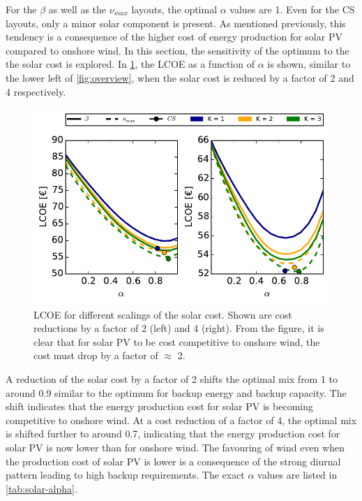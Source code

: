 \documentclass[a4paper, 12pt, sort&compress]{elsarticle}%
\begin{document}
For the $\beta$ as well as the $\nu_{max}$ layouts, the optimal
$\alpha$ values are 1. Even for the CS layouts, only a minor solar
component is present. As mentioned previously, this tendency is a
consequence of the higher cost of energy production for solar PV
compared to onshore wind. In this section, the sensitivity of the
optimum to the the solar cost is explored. In \cref{fig:red-solar}, the
LCOE as a function of $\alpha$ is shown, similar to the lower left of
\cref{fig:overview}, when the solar cost is reduced by a factor of 2
and 4 respectively.

\begin{figure}[h!]
  \centering
  \includegraphics[width = \columnwidth]{solarAnalysis}
  \caption{LCOE for different scalings of the solar cost. Shown are
    cost reductions by a factor of 2 (left) and 4 (right). From the
    figure, it is clear that for solar PV to be cost competitive to
    onshore wind, the cost must drop by a factor of
    $\approx$ 2.}
  \label{fig:red-solar}
\end{figure}

A reduction of the solar cost by a factor of 2 shifts the optimal mix
from 1 to around 0.9 similar to the optimum for backup energy and
backup capacity. The shift indicates that the energy production cost
for solar PV is becoming competitive to onshore wind. At a cost
reduction of a factor of 4, the optimal mix is shifted further to
around 0.7, indicating that the energy production cost for solar PV is
now lower than for onshore wind. The favouring of wind even when the
production cost of solar PV is lower is a consequence of the strong
diurnal pattern leading to high backup requirements. The exact
$\alpha$ values are listed in \cref{tab:solar-alpha}.
\end{document}

